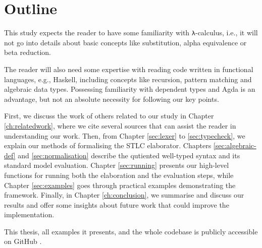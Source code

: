 \chapter{Outline}
\label{ch:outline}

This study expects the reader to have some familiarity with \verb$λ$-calculus, i.e., it will not go into details about basic concepts like substitution, alpha equivalence or beta reduction.

The reader will also need some expertise with reading code written in functional languages, e.g., Haskell, including concepts like recursion, pattern matching and algebraic data types. Possessing familiarity with dependent types and Agda is an advantage, but not an absolute necessity for following our key points.

First, we discuss the work of others related to our study in Chapter \ref{ch:relatedwork}, where we cite several sources that can assist the reader in understanding our work. Then, from Chapter \ref{sec:lexer} to \ref{sec:typecheck}, we explain our methods of formalising the STLC elaborator. Chapters \ref{sec:algebraic-def} and \ref{sec:normalisation} describe the qutiented well-typed syntax and its standard model evaluation. Chapter \ref{sec:running} presents our high-level functions for running both the elaboration and the evaluation steps, while Chapter \ref{sec:examples} goes through practical examples demonstrating the framework. Finally, in Chapter \ref{ch:conclusion}, we summarise and discuss our results and offer some insights about future work that could improve the implementation.

This thesis, all examples it presents, and the whole codebase is publicly accessible on GitHub \cite{home-repo}.

